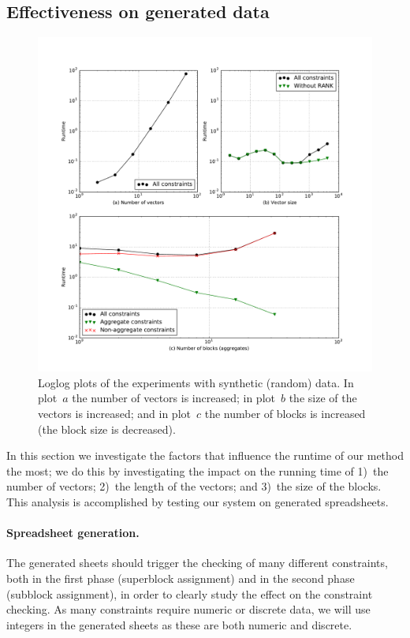 \subsection{Effectiveness on generated data}

\begin{figure}[t]
  \centering
  \includegraphics[width=0.8\linewidth]{figures/scatter_plots.pdf}
  \caption{Loglog plots of the experiments with synthetic (random) data. In plot~$a$ the number of vectors is increased; in plot~$b$ the size of the vectors is increased; and in plot~$c$ the number of blocks is increased (the block size is decreased).}
  \label{fig:runtime_analysis}
\end{figure}


In this section we investigate the factors that influence the runtime of our method the most; we do this by investigating the impact on the running time of 1)~the number of vectors; 2)~the length of the vectors; and 3)~the size of the blocks.
This analysis is accomplished by testing our system on generated spreadsheets.

\paragraph{Spreadsheet generation.}
The generated sheets should trigger the checking of many different constraints, both in the first phase (superblock assignment) and in the second phase (subblock assignment), in order to clearly study the effect on the constraint checking. As many constraints require numeric or discrete data, we will use integers in the generated sheets as these are both numeric and discrete.

